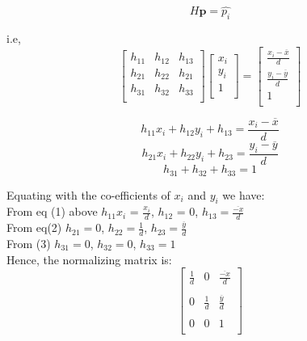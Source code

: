 \documentclass{article}
\begin{document}
 \[
 H\textbf{p} = \hat{p_{i}}
 \]

 i.e,
 \[
\begin{bmatrix}
    h_{11} &  h_{12} &  h_{13}\\
    h_{21} &  h_{22} &  h_{21}\\
    h_{31} &  h_{32} &  h_{33}\\
\end{bmatrix} \begin{bmatrix}
    x_{i}\\
    y_{i}\\
    1\\
\end{bmatrix} = \begin{bmatrix}
    \frac{x_{i} - \overline{x}}{d}\\
    \frac{y_{i} - \overline{y}}{d}\\
    1\\
\end{bmatrix}
\]

\begin{equation}
h_{11}x_{i}  + h_{12}y_{i} +  h_{13} =     \frac{x_{i} - \overline{x}}{d}
\end{equation}
\begin{equation}
h_{21}x_{i}  + h_{22}y_{i} +  h_{23} =     \frac{y_{i} - \overline{y}}{d}
\end{equation}
\begin{equation}
h_{31}  + h_{32} +  h_{33} =     1
\end{equation}

Equating with the co-efficients of $x_{i}$ and $y_{i}$ we have: \\

From eq (1) above
$h_{11}x_{i}$ = $\frac{x_{i}}{d}$, 
$h_{12}$ = 0, 
$h_{13} = \frac{\overline{-x}}{d}$ \\

From eq(2)
$h_{21} = 0$,
$h_{22} = \frac{1}{d}$,
$h_{23} = \frac{\overline{y}}{d}$ \\

From (3)
$h_{31} = 0$,
$h_{32} = 0$,
$h_{33} = 1$  \\


Hence, the normalizing matrix is: \\
\[
\begin{bmatrix}
    \frac{1}{d} &  0 &  \frac{\overline{-x}}{d}\\ \\
    0 & \frac{1}{d} &  \frac{\overline{y}}{d}\\ \\
    0 &  0 & 1\\
\end{bmatrix} 
\]
\end{document}
